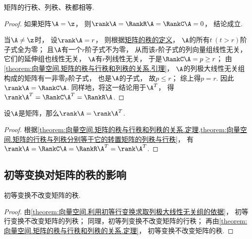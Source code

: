 \begin{theorem}\label{theorem:向量空间.矩阵的秩与行秩和列秩的关系.定理}
矩阵的行秩、列秩、秩都相等.
\begin{proof}
如果矩阵\(\A = \z\)，
则\(\rank\A=\RankR\A=\RankC\A=0\)，
结论成立.

当\(\A\neq\z\)时，
设\(\rank\A=r\)，
则根据\hyperref[definition:线性方程组.矩阵的秩的定义]{矩阵的秩的定义}，
\(\A\)的所有\(t\ (t > r)\)阶子式全为零；
且\(\A\)有一个\(r\)阶子式不为零，
从而该\(r\)阶子式的列向量组线性无关，
它们的延伸组也线性无关，
\(\A\)有\(r\)列线性无关，
于是\(\RankC\A=p \geq r\)；
由\cref{theorem:向量空间.矩阵的秩与行秩和列秩的关系.引理}，
\(\A\)的列极大线性无关组构成的矩阵有一非零\(p\)阶子式，
也是\(\A\)的子式，
故\(p \leq r\)；
综上得\(p = r\).
因此\(\rank\A=\RankC\A\).
同样地，将这一结论用于\(\A^T\)，
得\(\rank\A^T=\RankC\A^T=\RankR\A\).
\end{proof}
\end{theorem}

\begin{theorem}
设\(\A\)是矩阵，那么\(\rank\A = \rank\A^T\).
\begin{proof}
根据\cref{theorem:向量空间.矩阵的秩与行秩和列秩的关系.定理,theorem:向量空间.矩阵的行秩与列秩分别等于它的转置矩阵的列秩与行秩}，
有\(\rank\A=\RankC\A=\RankR\A^T=\rank\A^T\).
\end{proof}
\end{theorem}

\subsection{初等变换对矩阵的秩的影响}
\begin{theorem}\label{theorem:线性方程组.初等变换不变秩}
初等变换不改变矩阵的秩.
\begin{proof}
由\cref{theorem:向量空间.利用初等行变换求取列极大线性无关组的依据}，
初等行变换不改变矩阵的列秩；
同理，初等列变换不改变矩阵的行秩；
再由\cref{theorem:向量空间.矩阵的秩与行秩和列秩的关系.定理}，
初等变换不改变矩阵的秩.
\end{proof}
\end{theorem}

